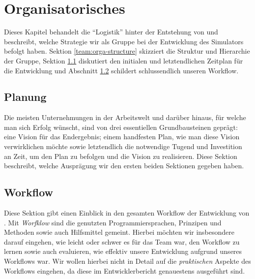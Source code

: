 
\section{Organisatorisches}
\label{team:orga}

Dieses Kapitel behandelt die ``Logistik'' hinter der Entstehung von \erasim{} und
beschreibt, welche Strategie wir als Gruppe bei der Entwicklung des Simulators
befolgt haben. Sektion \ref{team:orga-structure} skizziert die Struktur und
Hierarchie der Gruppe, Sektion \ref{team:orga-plan} diskutiert den initialen und
letztendlichen Zeitplan für die Entwicklung und Abschnitt
\ref{team:orga-workflow} schildert schlussendlich unseren Workflow.



\subsection{Planung}
\label{team:orga-plan}

Die meisten Unternehmungen in der Arbeitswelt und darüber hinaus, für welche man
sich Erfolg wünscht, sind von drei essentiellen Grundbausteinen geprägt: eine
Vision für das Endergebnis; einem handfesten Plan, wie man diese Vision
verwirklichen möchte sowie letztendlich die notwendige Tugend und Investition an
Zeit, um den Plan zu befolgen und die Vision zu realisieren. Diese Sektion
beschreibt, welche Ausprägung wir den ersten beiden Sektionen gegeben haben.





\subsection{Workflow}
\label{team:orga-workflow}

Diese Sektion gibt einen Einblick in den gesamten Workflow der Entwicklung von
\erasim{}. Mit \emph{Worfklow} sind die genutzten Programmiersprachen, Prinzipen und Methoden sowie auch Hilfsmittel gemeint. Hierbei möchten wir insbesondere darauf eingehen, wie leicht oder schwer es für das Team war, den Workflow zu lernen sowie auch evaluieren, wie effektiv unsere Entwicklung aufgrund unseres Workflows war. Wir wollen hierbei nicht in Detail auf die \emph{praktischen} Aspekte des Workflows eingehen, da diese im Entwicklerbericht genauestens ausgeführt sind.




